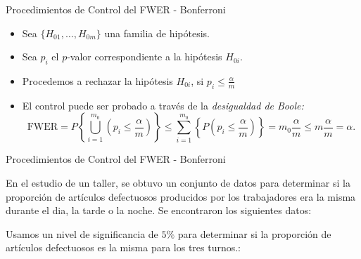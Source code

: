 \begin{frame}{Procedimientos de Control del FWER - Bonferroni}
\begin{itemize}[<+- | alert@+>]
    \item Sea $\{H_{01},\dots,H_{0m}\}$ una familia de hipótesis.
    \item Sea $p_i$ el $p$-valor correspondiente a la hipótesis $H_{0i}$.
    \item Procedemos a rechazar la hipótesis $H_{0i}$, si $p_i\leq\frac{\alpha}{m}$
    \item El control puede ser probado a través de la \textit{desigualdad de Boole:}
$$\mathrm{FWER}=P\left\{\bigcup_{i=1}^{m_{0}}\left(p_{i} \leq \frac{\alpha}{m}\right)\right\} \leq \sum_{i=1}^{m_{0}}\left\{P\left(p_{i} \leq \frac{\alpha}{m}\right)\right\}=m_{0} \frac{\alpha}{m} \leq m \frac{\alpha}{m}=\alpha.$$

\end{itemize}
\end{frame}


\begin{frame}{Procedimientos de Control del FWER - Bonferroni}
\begin{example}
    En el estudio de un taller, se obtuvo un conjunto de datos para determinar si la proporción de artículos defectuosos producidos por los trabajadores era la misma durante el dia, la tarde o la noche. Se encontraron los	siguientes datos:
    
	\begin{center}
	\end{center}
	
	Usamos un nivel de significancia de $5 \%$ para determinar si la proporción de artículos defectuosos es la misma para	los tres turnos.:
\end{example}
\end{frame}



